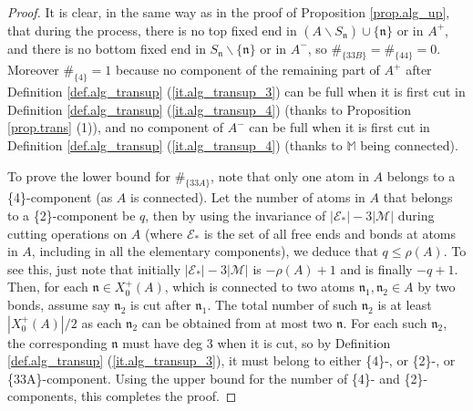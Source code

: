 \documentclass[10pt, reqno]{amsart}
\newcommand{\Mb}{\mathbb M}
\newcommand{\Ec}{\mathcal E}
\renewcommand{\Mc}{\mathcal M}
\newcommand{\nf}{\mathfrak n}
\theoremstyle{definition}
\theoremstyle{remark}
\numberwithin{equation}{section}
\begin{document}
\begin{proof} It is clear, in the same way as in the proof of Proposition \ref{prop.alg_up}, that during the process, there is no top fixed end in $(A\backslash S_\nf)\cup\{\nf\}$ or in $A^+$, and there is no bottom fixed end in $S_\nf\backslash\{\nf\}$ or in $A^-$, so $\#_{\{33B\}}=\#_{\{44\}}=0$. Moreover $\#_{\{4\}}=1$ because no component of the remaining part of $A^+$ after Definition \ref{def.alg_transup} (\ref{it.alg_transup_3}) can be full when it is first cut in Definition \ref{def.alg_transup} (\ref{it.alg_transup_4}) (thanks to Proposition \ref{prop.trans} (1)), and no component of $A^-$ can be full when it is first cut in Definition \ref{def.alg_transup} (\ref{it.alg_transup_4}) (thanks to $\Mb$ being connected).

To prove the lower bound for $\#_{\{33A\}}$, note that only one atom in $A$ belongs to a \{4\}-component (as $A$ is connected). Let the number of atoms in $A$ that belongs to a \{2\}-component be $q$, then by using the invariance of $|\Ec_*|-3|\Mc|$ during cutting operations on $A$ (where $\Ec_*$ is the set of all free ends and bonds at atoms in $A$, including in all the elementary components), we deduce that $q\leq\rho(A)$. To see this, just note that  initially $|\Ec_*|-3|\Mc|$ is $-\rho(A)+1$ and is finally $-q+1$. Then, for each $\nf\in X_0^+(A)$, which is connected to two atoms $\nf_1,\nf_2\in A$ by two bonds, assume say $\nf_2$ is cut after $\nf_1$. The total number of such $\nf_2$ is at least $|X_0^+(A)|/2$ as each $\nf_2$ can be obtained from at most two $\nf$. For each such $\nf_2$, the corresponding $\nf$ must have deg 3 when it is cut, so by Definition \ref{def.alg_transup} (\ref{it.alg_transup_3}), it must belong to either \{4\}-, or \{2\}-, or \{33A\}-component. Using the upper bound for the number of \{4\}- and \{2\}-components, this completes the proof.
\end{proof}
\end{document}

